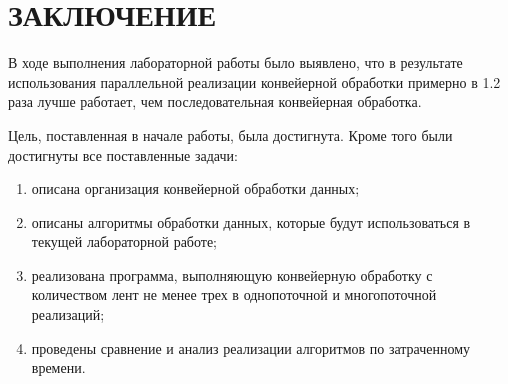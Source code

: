 \chapter*{\hfill{\centering  ЗАКЛЮЧЕНИЕ}\hfill}
В ходе выполнения лабораторной работы было выявлено, что в результате использования параллельной реализации конвейерной обработки примерно в 1.2 раза лучше работает, чем последовательная конвейерная обработка.

Цель, поставленная в начале работы, была достигнута. 
Кроме того были достигнуты все поставленные задачи:
\begin{enumerate}
	\item описана организация конвейерной обработки данных;
	\item описаны алгоритмы обработки данных, которые будут использоваться в текущей лабораторной работе;
	\item реализована программа, выполняющую конвейерную обработку с количеством лент не менее трех в однопоточной и многопоточной реализаций;
	\item проведены сравнение и анализ реализации алгоритмов по затраченному времени.
\end{enumerate}
